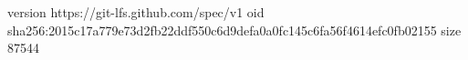 version https://git-lfs.github.com/spec/v1
oid sha256:2015c17a779e73d2fb22ddf550c6d9defa0a0fc145c6fa56f4614efc0fb02155
size 87544
